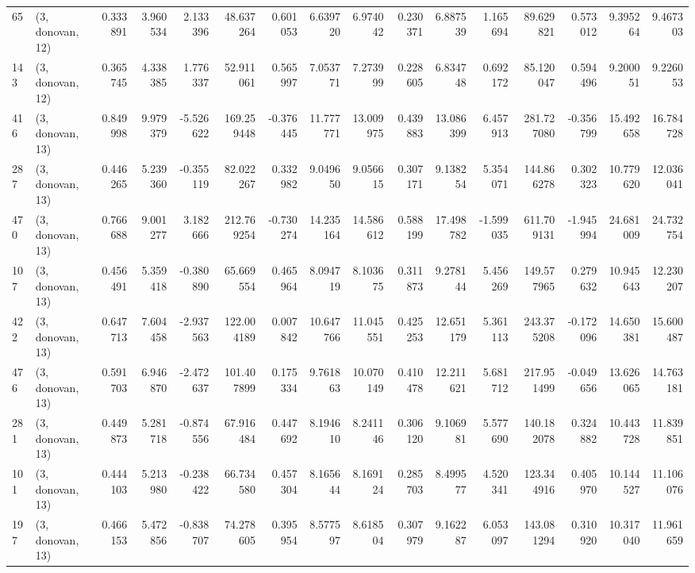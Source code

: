 \begin{tabular}{llrrrrrrrrrrrrrr}
65  &  (3, donovan, 12) &   0.333891 &   3.960534 &   2.133396 &    48.637264 &   0.601053 &   6.639720 &   6.974042 &  0.230371 &   6.887539 &   1.165694 &    89.629821 &  0.573012 &   9.395264 &   9.467303 \\
143 &  (3, donovan, 12) &   0.365745 &   4.338385 &   1.776337 &    52.911061 &   0.565997 &   7.053771 &   7.273999 &  0.228605 &   6.834748 &   0.692172 &    85.120047 &  0.594496 &   9.200051 &   9.226053 \\
416 &  (3, donovan, 13) &   0.849998 &   9.979379 &  -5.526622 &   169.259448 &  -0.376445 &  11.777771 &  13.009975 &  0.439883 &  13.086399 &   6.457913 &   281.727080 & -0.356799 &  15.492658 &  16.784728 \\
287 &  (3, donovan, 13) &   0.446265 &   5.239360 &  -0.355119 &    82.022267 &   0.332982 &   9.049650 &   9.056615 &  0.307171 &   9.138254 &   5.354071 &   144.866278 &  0.302323 &  10.779620 &  12.036041 \\
470 &  (3, donovan, 13) &   0.766688 &   9.001277 &   3.182666 &   212.769254 &  -0.730274 &  14.235164 &  14.586612 &  0.588199 &  17.498782 &  -1.599035 &   611.709131 & -1.945994 &  24.681009 &  24.732754 \\
107 &  (3, donovan, 13) &   0.456491 &   5.359418 &  -0.380890 &    65.669554 &   0.465964 &   8.094719 &   8.103675 &  0.311873 &   9.278144 &   5.456269 &   149.577965 &  0.279632 &  10.945643 &  12.230207 \\
422 &  (3, donovan, 13) &   0.647713 &   7.604458 &  -2.937563 &   122.004189 &   0.007842 &  10.647766 &  11.045551 &  0.425253 &  12.651179 &   5.361113 &   243.375208 & -0.172096 &  14.650381 &  15.600487 \\
476 &  (3, donovan, 13) &   0.591703 &   6.946870 &  -2.472637 &   101.407899 &   0.175334 &   9.761863 &  10.070149 &  0.410478 &  12.211621 &   5.681712 &   217.951499 & -0.049656 &  13.626065 &  14.763181 \\
281 &  (3, donovan, 13) &   0.449873 &   5.281718 &  -0.874556 &    67.916484 &   0.447692 &   8.194610 &   8.241146 &  0.306120 &   9.106981 &   5.577690 &   140.182078 &  0.324882 &  10.443728 &  11.839851 \\
101 &  (3, donovan, 13) &   0.444103 &   5.213980 &  -0.238422 &    66.734580 &   0.457304 &   8.165644 &   8.169124 &  0.285703 &   8.499577 &   4.520341 &   123.344916 &  0.405970 &  10.144527 &  11.106076 \\
197 &  (3, donovan, 13) &   0.466153 &   5.472856 &  -0.838707 &    74.278605 &   0.395954 &   8.577597 &   8.618504 &  0.307979 &   9.162287 &   6.053097 &   143.081294 &  0.310920 &  10.317040 &  11.961659 \\

\end{tabular}
